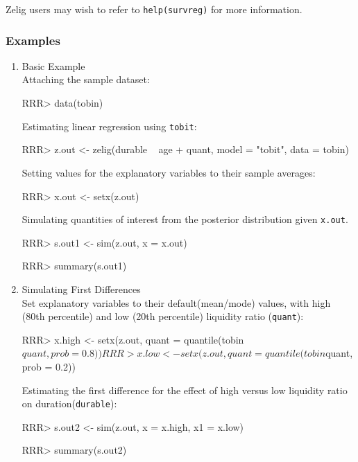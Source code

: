 Zelig users may wish to refer to \texttt{help(survreg)} for more 
information.

\subsubsection{Examples}

\begin{enumerate}
\item {Basic Example} \\
Attaching the sample  dataset:
\begin{Schunk}
\begin{Sinput}
RRR>  data(tobin)
\end{Sinput}
\end{Schunk}
Estimating linear regression using \texttt{tobit}:
\begin{Schunk}
\begin{Sinput}
RRR>  z.out <- zelig(durable ~ age + quant, model = "tobit", data = tobin)
\end{Sinput}
\end{Schunk}
Setting values for the explanatory variables to their sample averages:
\begin{Schunk}
\begin{Sinput}
RRR>  x.out <- setx(z.out)
\end{Sinput}
\end{Schunk}
Simulating quantities of interest from the posterior distribution given 
\texttt{x.out}.
\begin{Schunk}
\begin{Sinput}
RRR>  s.out1 <- sim(z.out, x = x.out)
\end{Sinput}
\end{Schunk}
\begin{Schunk}
\begin{Sinput}
RRR> summary(s.out1)
\end{Sinput}
\end{Schunk}
\item {Simulating First Differences} \\
Set explanatory variables to their default(mean/mode) values, with high
(80th percentile) and low (20th percentile) liquidity ratio (\texttt{quant}):

\begin{Schunk}
\begin{Sinput}
RRR>  x.high <- setx(z.out, quant = quantile(tobin$quant, prob = 0.8))
RRR>  x.low <- setx(z.out, quant = quantile(tobin$quant, prob = 0.2))
\end{Sinput}
\end{Schunk}
Estimating the first difference for the effect of
high versus low liquidity ratio on duration(\texttt{durable}):
\begin{Schunk}
\begin{Sinput}
RRR>  s.out2 <- sim(z.out, x = x.high, x1 = x.low)
\end{Sinput}
\end{Schunk}
\begin{Schunk}
\begin{Sinput}
RRR> summary(s.out2)
\end{Sinput}
\end{Schunk}
\end{enumerate} 

